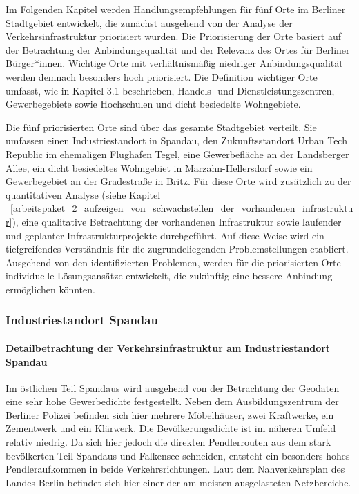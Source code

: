Im Folgenden Kapitel werden Handlungsempfehlungen für fünf Orte im Berliner Stadtgebiet entwickelt, die zunächst ausgehend von der Analyse der Verkehrsinfrastruktur priorisiert wurden. Die Priorisierung der Orte basiert auf der Betrachtung der Anbindungsqualität und der Relevanz des Ortes für Berliner Bürger*innen. Wichtige Orte mit verhältnismäßig niedriger Anbindungsqualität werden demnach besonders hoch priorisiert. Die Definition wichtiger Orte umfasst, wie in Kapitel 3.1 beschrieben, Handels- und Dienstleistungszentren, Gewerbegebiete sowie Hochschulen und dicht besiedelte Wohngebiete.

Die fünf priorisierten Orte sind über das gesamte Stadtgebiet verteilt. Sie umfassen einen Industriestandort in Spandau, den Zukunftsstandort Urban Tech Republic im ehemaligen Flughafen Tegel, eine Gewerbefläche an der Landsberger Allee, ein dicht besiedeltes Wohngebiet in Marzahn-Hellersdorf sowie ein Gewerbegebiet an der Gradestraße in Britz. Für diese Orte wird zusätzlich zu der quantitativen Analyse (siehe Kapitel ~\ref{arbeitspaket_2_aufzeigen_von_schwachstellen_der_vorhandenen_infrastruktur}), eine qualitative Betrachtung der vorhandenen Infrastruktur sowie laufender und geplanter Infrastrukturprojekte durchgeführt. Auf diese Weise wird ein tiefgreifendes Verständnis für die zugrundeliegenden Problemstellungen etabliert. Ausgehend von den identifizierten Problemen, werden für die priorisierten Orte individuelle Lösungsansätze entwickelt, die zukünftig eine bessere Anbindung ermöglichen könnten.

\subsubsection{Industriestandort Spandau}
\paragraph{Detailbetrachtung der Verkehrsinfrastruktur am Industriestandort Spandau}
Im östlichen Teil Spandaus wird ausgehend von der Betrachtung der Geodaten eine sehr hohe Gewerbedichte festgestellt. Neben dem Ausbildungszentrum der Berliner Polizei befinden sich hier mehrere Möbelhäuser, zwei Kraftwerke, ein Zementwerk und ein Klärwerk. Die Bevölkerungsdichte ist im näheren Umfeld relativ niedrig. Da sich hier jedoch die direkten Pendlerrouten aus dem stark bevölkerten Teil Spandaus und Falkensee schneiden, entsteht ein besonders hohes Pendleraufkommen in beide Verkehrsrichtungen. Laut dem Nahverkehrsplan des Landes Berlin befindet sich hier einer der am meisten ausgelasteten Netzbereiche.

